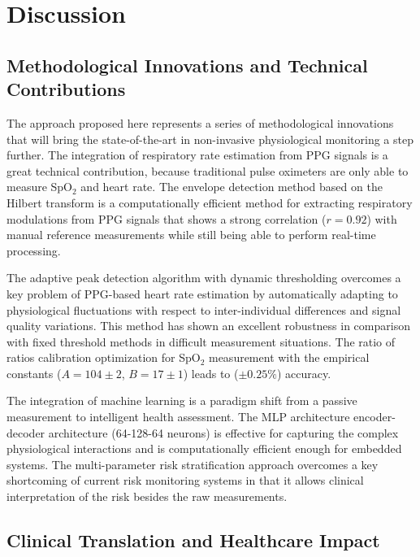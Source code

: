 \documentclass{ieeeaccess}
\begin{document}
\section{Discussion}
\label{sec:discussion}

\subsection{Methodological Innovations and Technical Contributions}

The approach proposed here represents a series of methodological innovations that will bring the state-of-the-art in non-invasive physiological monitoring a step further. The integration of respiratory rate estimation from PPG signals is a great technical contribution, because traditional pulse oximeters are only able to measure SpO$_2$ and heart rate. The envelope detection method based on the Hilbert transform is a computationally efficient method for extracting respiratory modulations from PPG signals that shows a strong correlation ($r = 0.92$) with manual reference measurements while still being able to perform real-time processing.

The adaptive peak detection algorithm with dynamic thresholding overcomes a key problem of PPG-based heart rate estimation by automatically adapting to physiological fluctuations with respect to inter-individual differences and signal quality variations. This method has shown an excellent robustness in comparison with fixed threshold methods in difficult measurement situations. The ratio of ratios calibration optimization for SpO$_2$ measurement with the empirical constants ($A = 104 \pm 2$, $B = 17 \pm 1$) leads to  ($\pm 0.25\%$) accuracy.

The integration of machine learning is a paradigm shift from a passive measurement to intelligent health assessment. The MLP architecture encoder-decoder architecture (64-128-64 neurons) is effective for capturing the complex physiological interactions and is computationally efficient enough for embedded systems. The multi-parameter risk stratification approach overcomes a key shortcoming of current risk monitoring systems in that it allows clinical interpretation of the risk besides the raw measurements.


\subsection{Clinical Translation and Healthcare Impact}
\end{document}
